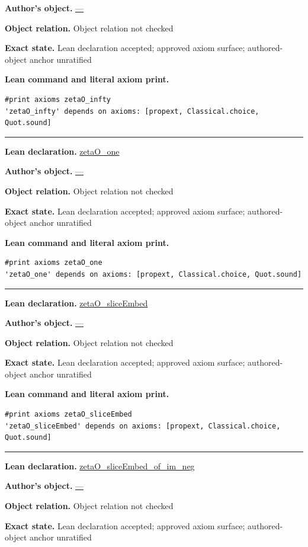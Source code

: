 \documentclass[11pt]{article}
\theoremstyle{plain}
\theoremstyle{definition}
\theoremstyle{remark}
\begin{document}
\begin{tcolorbox}[provenancecard,title={17. Definition - Octonionic zeta},title after break={17. Definition - Octonionic zeta (continued)}]
\par\textbf{Author's object.} \url{—}
\par\textbf{Object relation.} Object relation not checked
\par\textbf{Exact state.} Lean declaration accepted; approved axiom surface; authored-object anchor unratified
\par\smallskip\textbf{Lean command and literal axiom print.}
\begin{Verbatim}[breaklines=true,breakanywhere=true,fontsize=\small]
#print axioms zetaO_infty
'zetaO_infty' depends on axioms: [propext, Classical.choice, Quot.sound]
\end{Verbatim}
\medskip\hrule\medskip
\textbf{Lean declaration.} \url{zetaO_one}
\par\textbf{Author's object.} \url{—}
\par\textbf{Object relation.} Object relation not checked
\par\textbf{Exact state.} Lean declaration accepted; approved axiom surface; authored-object anchor unratified
\par\smallskip\textbf{Lean command and literal axiom print.}
\begin{Verbatim}[breaklines=true,breakanywhere=true,fontsize=\small]
#print axioms zetaO_one
'zetaO_one' depends on axioms: [propext, Classical.choice, Quot.sound]
\end{Verbatim}
\medskip\hrule\medskip
\textbf{Lean declaration.} \url{zetaO_sliceEmbed}
\par\textbf{Author's object.} \url{—}
\par\textbf{Object relation.} Object relation not checked
\par\textbf{Exact state.} Lean declaration accepted; approved axiom surface; authored-object anchor unratified
\par\smallskip\textbf{Lean command and literal axiom print.}
\begin{Verbatim}[breaklines=true,breakanywhere=true,fontsize=\small]
#print axioms zetaO_sliceEmbed
'zetaO_sliceEmbed' depends on axioms: [propext, Classical.choice, Quot.sound]
\end{Verbatim}
\medskip\hrule\medskip
\textbf{Lean declaration.} \url{zetaO_sliceEmbed_of_im_neg}
\par\textbf{Author's object.} \url{—}
\par\textbf{Object relation.} Object relation not checked
\par\textbf{Exact state.} Lean declaration accepted; approved axiom surface; authored-object anchor unratified

\end{tcolorbox}
\end{document}
